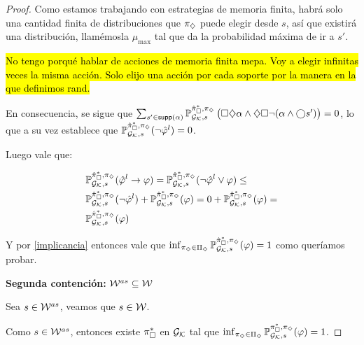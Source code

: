 \begin{proof}
{		Como estamos trabajando con estrategias de memoria finita, habrá solo una
		cantidad finita de distribuciones que $\pi_\diamondsuit$ puede elegir desde $s$, así que
		existirá una distribución, llamémosla $\mu_{\max}$ tal que da la probabilidad
		máxima de ir a $s'$.}

	\hl{No tengo porqué hablar de acciones de memoria finita mepa. Voy a elegir infinitas veces la misma acción. Solo elijo una acción por cada soporte por la manera en la que definimos rand.}


	En consecuencia, se sigue que $\sum_{s' \in \textsf{supp}(\alpha)} \mathbb{P}_{\mathcal{G}_{\mathcal{K}},
			s}^{\hat{\pi}_{\square}^{*}, \pi_\diamondsuit} \left( \square \diamondsuit \alpha \wedge \diamondsuit \square \neg
			(\alpha \wedge \bigcirc s' ) \right) = 0$, lo que a su vez establece que
	$\mathbb{P}_{\mathcal{G}_{\mathcal{K}}, s}^{\hat{\pi}_{\square}^{*}, \pi_\diamondsuit}(\neg \hat{\varphi}^l) = 0$.

	Luego vale que:

	\begin{align*}
		&\mathbb{P}_{\mathcal{G}_{\mathcal{K}},s}^{\hat{\pi}_{\square}^{*}, \pi_\diamondsuit}(\hat{\varphi}^l \rightarrow \varphi) = \mathbb{P}_{\mathcal{G}_{\mathcal{K}},s}^{\hat{\pi}_{\square}^{*}, \pi_\diamondsuit}(\neg \hat{\varphi}^l \vee \varphi) \leq \\
		&\mathbb{P}_{\mathcal{G}_{\mathcal{K}},s}^{\hat{\pi}_{\square}^{*}, \pi_\diamondsuit}(\neg \hat{\varphi}^l) + \mathbb{P}_{\mathcal{G}_{\mathcal{K}},s}^{\hat{\pi}_{\square}^{*}, \pi_\diamondsuit}(\varphi) = 0 + \mathbb{P}_{\mathcal{G}_{\mathcal{K}},s}^{\hat{\pi}_{\square}^{*}, \pi_\diamondsuit}(\varphi) = \\
		&\mathbb{P}_{\mathcal{G}_{\mathcal{K}},s}^{\hat{\pi}_{\square}^{*}, \pi_\diamondsuit}(\varphi)
	\end{align*}

	Y por \ref{implicancia} entonces vale que $\inf_{\pi_\diamondsuit \in \Pi_\diamondsuit}
		\mathbb{P}_{\mathcal{G}_{\mathcal{K}},s}^{\hat{\pi}_{\square}^{*}, \pi_\diamondsuit}(\varphi) = 1$ como queríamos probar.


	\textbf{Segunda contención: } $\mathcal{W}^{as} \subseteq \mathcal{W}$

	Sea $s \in \mathcal{W}^{as}$, veamos que $s \in \mathcal{W}$.

	Como $s \in \mathcal{W}^{as}$, entonces existe $\pi_\square^*$ en $\mathcal{G}_{\mathcal{K}}$ tal que
	$\inf_{\pi_\diamondsuit \in \Pi_\diamondsuit}\mathbb{P}_{\mathcal{G}_{\mathcal{K}},s}^{\pi_\square^*, \pi_\diamondsuit}(\varphi) = 1$.


\end{proof}
